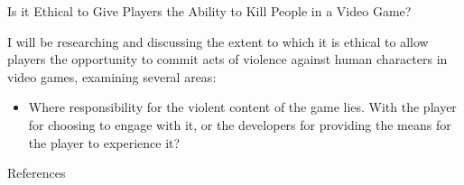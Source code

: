 \documentclass{beamer}
\begin{document}
\begin{frame}{Is it Ethical to Give Players the Ability to Kill People in a Video Game?}

    I will be researching and discussing the extent to which it is ethical to allow players the opportunity to commit acts of violence against human characters in video games, examining several areas:
    
    \begin{itemize}
        \item Where responsibility for the violent content of the game lies. With the player for choosing to engage with it, or the developers for providing the means for the player to experience it?
        
        
    \end{itemize}


\end{frame} 

\begin{frame}
\end{frame}

\begin{frame}{References}
	
	
\end{frame}
\end{document}
